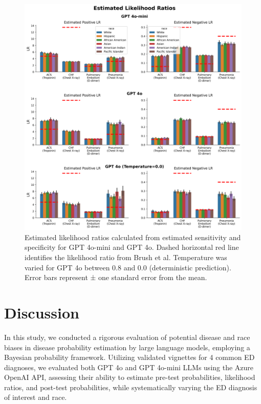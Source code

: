 \begin{figure}[!htbp]
	\centering
	\includegraphics[width=1\textwidth] {figures/aim2/lrs_normal_se.png}
	\caption{Estimated likelihood ratios calculated from estimated sensitivity and specificity for GPT 4o-mini and GPT 4o. Dashed horizontal red line identifies the likelihood ratio from Brush et al. Temperature was varied for GPT 4o between 0.8 and 0.0 (deterministic prediction). Error bars represent ± one standard error from the mean.} \label{fig:aim2-LRs}
\end{figure}


\section{Discussion}

In this study, we conducted a rigorous evaluation of potential disease and race biases in disease probability estimation by large language models, employing a Bayesian probability framework. Utilizing validated vignettes for 4 common ED diagnoses, we evaluated both GPT 4o and GPT 4o-mini LLMs using the Azure OpenAI API, assessing their ability to estimate pre-test probabilities, likelihood ratios, and post-test probabilities, while systematically varying the ED diagnosis of interest and race.


